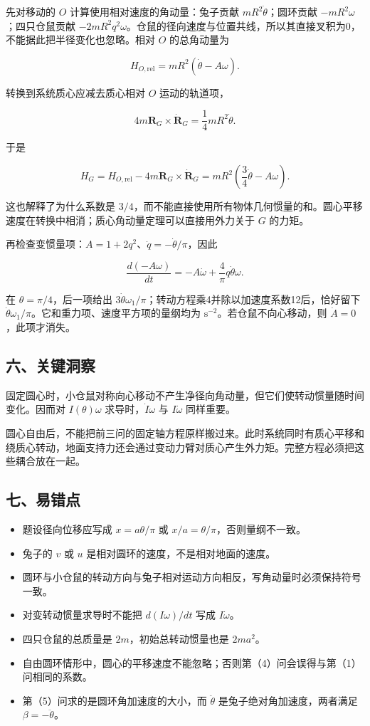 \documentclass[12pt,a4paper,UTF8]{ctexart}
\newcommand{\tightlist}{\setlength{\itemsep}{0pt}\setlength{\parskip}{0pt}}
\begin{document}
先对移动的 \(O\) 计算使用相对速度的角动量：兔子贡献
\(mR^2\dot\theta\)；圆环贡献 \(-mR^2\omega\)；四只仓鼠贡献
\(-2mR^2q^2\omega\)。仓鼠的径向速度与位置共线，所以其直接叉积为0，不能据此把半径变化也忽略。相对
\(O\) 的总角动量为

\[H_{O,\mathrm{rel}}=mR^2(\dot\theta-A\omega).\]

转换到系统质心应减去质心相对 \(O\) 运动的轨道项，

\[4m\bm R_G\times\dot{\bm R}_G
=\frac14mR^2\dot\theta.\]

于是

\[H_G=H_{O,\mathrm{rel}}-4m\bm R_G\times\dot{\bm R}_G
=mR^2\left(\frac34\dot\theta-A\omega\right).\]

这也解释了为什么系数是
\(3/4\)，而不能直接使用所有物体几何惯量的和。圆心平移速度在转换中相消；质心角动量定理可以直接用外力关于
\(G\) 的力矩。

再检查变惯量项：\(A=1+2q^2\)、\(\dot q=-\dot\theta/\pi\)，因此

\[\frac{d(-A\omega)}{dt}
=-A\dot\omega+\frac4\pi q\dot\theta\omega.\]

在 \(\theta=\pi/4\)，后一项给出
\(3\dot\theta\omega_1/\pi\)；转动方程乘4并除以加速度系数12后，恰好留下
\(\dot\theta\omega_1/\pi\)。它和重力项、速度平方项的量纲均为
\(\mathrm{s}^{-2}\)。若仓鼠不向心移动，则 \(\dot A=0\)，此项才消失。

\subsection{六、关键洞察}\label{ux516dux5173ux952eux6d1eux5bdf-7}

固定圆心时，小仓鼠对称向心移动不产生净径向角动量，但它们使转动惯量随时间变化。因而对
\(I(\theta)\omega\) 求导时，\(\dot I\omega\) 与 \(I\dot\omega\)
同样重要。

圆心自由后，不能把前三问的固定轴方程原样搬过来。此时系统同时有质心平移和绕质心转动，地面支持力还会通过变动力臂对质心产生外力矩。完整方程必须把这些耦合放在一起。

\subsection{七、易错点}\label{ux4e03ux6613ux9519ux70b9-7}

\begin{itemize}
\tightlist
\item
  题设径向位移应写成 \(x=a\theta/\pi\) 或
  \(x/a=\theta/\pi\)，否则量纲不一致。
\item
  兔子的 \(v\) 或 \(u\) 是相对圆环的速度，不是相对地面的速度。
\item
  圆环与小仓鼠的转动方向与兔子相对运动方向相反，写角动量时必须保持符号一致。
\item
  对变转动惯量求导时不能把 \(d(I\omega)/dt\) 写成 \(I\dot\omega\)。
\item
  四只仓鼠的总质量是 \(2m\)，初始总转动惯量也是 \(2ma^2\)。
\item
  自由圆环情形中，圆心的平移速度不能忽略；否则第（4）问会误得与第（1）问相同的系数。
\item
  第（5）问求的是圆环角加速度的大小，而 \(\ddot\theta\)
  是兔子绝对角加速度，两者满足 \(\beta=-\ddot\theta\)。
\end{itemize}
\end{document}
